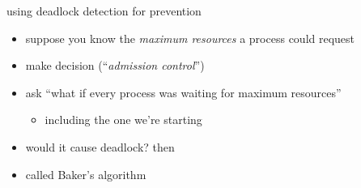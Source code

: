 \begin{frame}{using deadlock detection for prevention}
\begin{itemize}
\item suppose you know the \textit{maximum resources} a process could request
\item make decision  (``\textit{admission control}'')
\vspace{.5cm}
\item<2-> ask ``what if every process was waiting for maximum resources''
    \begin{itemize}
    \item including the one we're starting
    \end{itemize}
\item<2-> would it cause deadlock? then 
\vspace{.5cm}
\item<2-> called Baker's algorithm
\end{itemize}
\end{frame}
